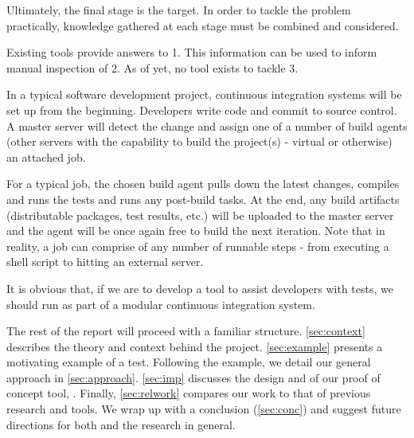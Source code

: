 Ultimately, the final stage is the target. In order to tackle the problem
practically, knowledge gathered at each stage must be combined and considered.

Existing tools provide answers to 1. This information can be used to inform
manual inspection of 2. As of yet, no tool exists to tackle 3.

In a typical software development project, continuous integration systems will
be set up from the beginning. Developers write code and commit to source
control. A master server will detect the change and assign one of a number of
build agents (other servers with the capability to build the project(s) -
virtual or otherwise) an attached job.

For a typical job, the chosen build agent pulls down the latest changes,
compiles and runs the tests and runs any post-build tasks. At the end, any build
artifacts (distributable packages, test results, etc.) will be uploaded to the
master server and the agent will be once again free to build the next iteration.
Note that in reality, a job can comprise of any number of runnable steps - from
executing a shell script to hitting an external server.

It is obvious that, if we are to develop a tool to assist developers with \flaky
tests, we should run as part of a modular continuous integration system.

The rest of the report will proceed with a familiar structure.
\autoref{sec:context} describes the theory and context behind the project.
\autoref{sec:example} presents a motivating example of a \flaky test. Following
the example, we detail our general approach in \autoref{sec:approach}.
\autoref{sec:imp} discusses the design and of our proof of concept tool,
\venera. Finally, \autoref{sec:relwork} compares our work to that of previous
research and tools. We wrap up with a conclusion (\autoref{sec:conc}) and
suggest future directions for both \venera and the research in general.

